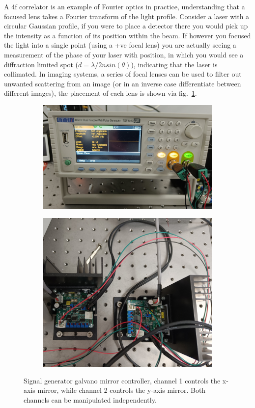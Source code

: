 A 4f correlator is an example of Fourier optics in practice, understanding
that a focused lens takes a Fourier transform of the light profile. 
Consider a laser with a circular Gaussian profile, if you were to place 
a detector there you would pick up the intensity as a function of its 
position within the beam. If however you focused the light into a single 
point (using a +ve focal lens) you are actually seeing a measurement of 
the phase of your laser with position, in which you would see a diffraction
limited spot ($d = \lambda/2nsin(\theta)$), indicating that the laser is 
collimated. In imaging systems, a series of focal lenses can be used to 
filter out unwanted scattering from an image (or in an inverse case 
differentiate between different images), the placement of each lens is 
shown via fig.~\ref{fig:signal_generator}.
\begin{figure}[h!]
	\centering
	\begin{subfigure}{0.475\linewidth}
		\includegraphics[width=\linewidth]{signal_generator.jpg}
		\caption{}
	\end{subfigure}
	\begin{subfigure}{0.475\linewidth}
		\includegraphics[width=\linewidth, height=0.7\linewidth]
		{galvano_mirror_controllers.jpg}
		\caption{}
	\end{subfigure}

	\caption{Signal generator galvano mirror controller, channel 1 controls the x-axis 
		mirror, while channel 2 controls the y-axis mirror. Both channels can be manipulated
		independently.}
	\label{fig:signal_generator}
\end{figure}

